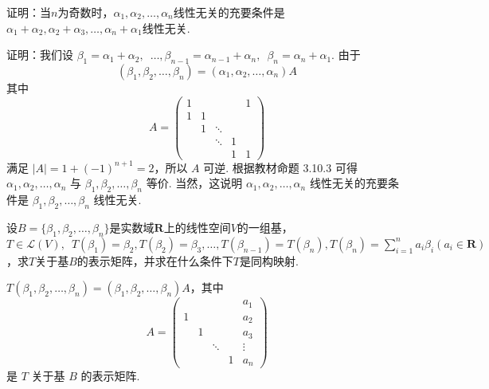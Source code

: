 \begin{exercise}
\begin{exgroup}
        \item 证明：当$n$为奇数时，$\alpha_1,\alpha_2,\ldots,\alpha_n$线性无关的充要条件是$\alpha_1+\alpha_2,\alpha_2+\alpha_3,\ldots,\alpha_n+\alpha_1$线性无关.
        \begin{answer}
            证明：我们设 $ \beta_1 = \alpha_1 + \alpha_2,\enspace \ldots, \beta_{n - 1} = \alpha_{n - 1} + \alpha_n,\enspace \beta_n = \alpha_n + \alpha_1 $. 由于
            \[ (\beta_1, \beta_2, \ldots, \beta_n) = (\alpha_1, \alpha_2, \ldots, \alpha_n) A \]
            其中
            \[ A = \begin{pmatrix}
                    1 &   &        &   & 1 \\
                    1 & 1 &        &   &   \\
                        & 1 & \ddots &   &   \\
                        &   & \ddots & 1 &   \\
                        &   &        & 1 & 1
                \end{pmatrix} \]
            满足 $ |A| = 1 + (-1)^{n + 1} = 2 $，所以 $ A $ 可逆. 根据教材命题 3.10.3 可得 $ \alpha_1, \alpha_2, \ldots, \alpha_n $ 与 $ \beta_1, \beta_2, \ldots, \beta_n $ 等价. 当然，这说明 $ \alpha_1, \alpha_2, \ldots, \alpha_n $ 线性无关的充要条件是 $ \beta_1, \beta_2, \ldots, \beta_n $ 线性无关.
        \end{answer}

        \item 设$B=\{\beta_1,\beta_2,\ldots,\beta_n\}$是实数域$\mathbf{R}$上的线性空间$V$的一组基，$T \in \mathcal{L}(V),\enspace T(\beta_1)=\beta_2,T(\beta_2)=\beta_3,\ldots,T(\beta_{n-1})=T(\beta_n),T(\beta_n)=\displaystyle\sum_{i=1}^{n}a_i\beta_i(a_i \in \mathbf{R})$，求$T$关于基$B$的表示矩阵，并求在什么条件下$T$是同构映射.
        \begin{answer}
            $ T(\beta_1, \beta_2, \ldots, \beta_n) = (\beta_1, \beta_2, \ldots, \beta_n)A $，其中
            \[ A = \begin{pmatrix}
                      &   &        &   & a_1    \\
                    1 &   &        &   & a_2    \\
                      & 1 &        &   & a_3    \\
                      &   & \ddots &   & \vdots \\
                      &   &        & 1 & a_n
                \end{pmatrix} \]
            是 $ T $ 关于基 $ B $ 的表示矩阵.


\end{answer}
\end{exgroup}
\end{exercise}
